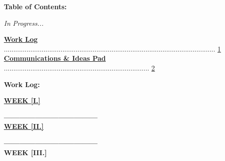 \documentclass[11pt]{article}
\begin{document}
\begin{blackbox}{\begin{center}\Large\textbf{Table of Contents:}\end{center}}
\begin{center}\large\textit{In Progress...}\end{center}

\large\textbf{\hyperlink{page.1}{Work Log}} ................................................................................................................ \hyperlink{page.1}{1}\\
\large\textbf{\hyperlink{page.2}{Communications \& Ideas Pad}} ............................................................................. \hyperlink{page.2}{2}
\end{blackbox}

\begin{blackbox}{\begin{center}\Large\textbf{Work Log:}\end{center}}
\hspace{-0.3cm}\small\textbf{\hyperlink{page.3}{WEEK [I.]}}
\vspace{0.25em}

\normalsize\indent \vline\textbf{------------}\hyperlink{page.3}{}\textbf{------}\hyperlink{page.3}{}\textbf{------}\hyperlink{page.5}{}\textbf{------}\hyperlink{page.7}{}\textbf{------}\hyperlink{page.7}{} \\

\vspace{-1em}
\hspace{-0.3cm}\small\textbf{\hyperlink{page.8}{WEEK [II.]}}
\vspace{0.25em}

\normalsize\indent \vline\textbf{------------}\textbf{------}\hyperlink{page.8}{}\textbf{------}\textbf{------}\textbf{------} \\

\vspace{-1em}
\hspace{-0.3cm}\small\textbf{WEEK [III.]}
\vspace{0.25em}


\end{blackbox}
\end{document}
